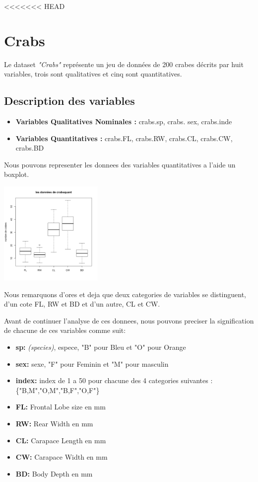 \documentclass[]{report}
\begin{document}
<<<<<<< HEAD
\section{Crabs}
Le dataset \textit{"Crabs"} représente un jeu de données de 200 crabes décrits par huit variables, trois sont qualitatives et cinq sont quantitatives.

\subsection{Description des variables}


\begin{itemize}
	\item \textbf{Variables Qualitatives Nominales :}  crabs.sp, crabs. sex, crabs.inde
	\item \textbf{Variables Quantitatives : } crabs.FL, crabs.RW, crabs.CL, crabs.CW, crabs.BD
\end{itemize}

Nous pouvons representer les donnees des variables quantitatives a l'aide un boxplot.
\begin{center}
	\includegraphics[width=50mm]{Figures/Crabs/bxp_crabsquant.png}
	\label{fig:boxplot_crabs_quantitatives}
\end{center}

Nous remarquons d'ores et deja que deux categories de variables se distinguent, d'un cote FL, RW et BD et d'un autre, CL et CW.

Avant de continuer l'analyse de ces donnees, nous pouvons preciser la signification de chacune de ces variables comme suit:
\begin{itemize}
	\item \textbf{sp:} \textit{(species)}, espece, "B" pour Bleu et "O" pour Orange
	\item \textbf{sex:} sexe, "F" pour Feminin et "M" pour masculin
	\item \textbf{index:} index de 1 a 50 pour chacune des 4 categories suivantes : \{"B,M","O,M","B,F","O,F"\}
	\item \textbf{FL:} Frontal Lobe size en mm
	\item \textbf{RW:} Rear Width en mm
	\item \textbf{CL:} Carapace Length en mm
	\item \textbf{CW:} Carapace Width en mm 
	\item \textbf{BD:} Body Depth en mm
\end{itemize}
\end{document}

